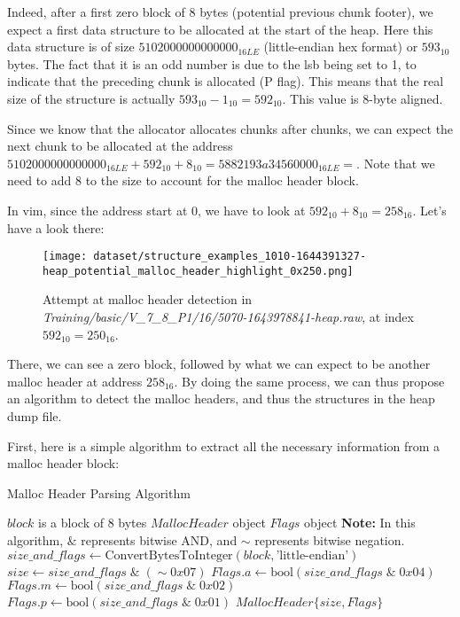     Indeed, after a first zero block of 8 bytes (potential previous chunk footer), we expect a first data structure to be allocated at the start of the heap. Here this data structure is of size $ 5102000000000000_{16LE} $ (little-endian hex format) or $ 593_{10} $ bytes. The fact that it is an odd number is due to the \acrshort{lsb} being set to 1, to indicate that the preceding chunk is allocated (P flag). This means that the real size of the structure is actually $ 593_{10} - 1_{10} = 592_{10} $. This value is 8-byte aligned.

    Since we know that the allocator allocates chunks after chunks, we can expect the next chunk to be allocated at the address $ 5102000000000000_{16LE} + 592_{10} + 8_{10} = 5882193a34560000_{16LE} =  $. Note that we need to add 8 to the size to account for the malloc header block.
    
    In vim, since the address start at 0, we have to look at $ 592_{10} + 8_{10} = 258_{16} $. Let's have a look there:

    \begin{figure}[H]
        \centering
        \texttt{[image: dataset/structure\_examples\_1010-1644391327-heap\_potential\_malloc\_header\_highlight\_0x250.png]}
        \caption{Attempt at malloc header detection in \textit{Training/basic/V\_7\_8\_P1/16/5070-1643978841-heap.raw}, at index $ 592_{10} = 250_{16} $.}
    \end{figure}

    There, we can see a zero block, followed by what we can expect to be another malloc header at address $ 258_{16} $. By doing the same process, we can thus propose an algorithm to detect the malloc headers, and thus the structures in the heap dump file.

    First, here is a simple algorithm to extract all the necessary information from a malloc header block:

    \begin{algorithm}[H]\label{alg:malloc_header_parsing}
        \caption{Malloc Header Parsing Algorithm}
        \begin{algorithmic}[1]
            \Require $block$ is a block of 8 bytes
            \Ensure $MallocHeader$ object
            \Ensure $Flags$ object
            \State \textbf{Note:} In this algorithm, $\&$ represents bitwise AND, and $\sim$ represents bitwise negation.
            \State $size\_and\_flags \leftarrow \text{ConvertBytesToInteger}(block, \text{'little-endian'})$
            \State $size \leftarrow size\_and\_flags \; \& \; (\sim 0x07)$ 
            \State $Flags.a \leftarrow \text{bool}(size\_and\_flags \; \& \; 0x04)$
            \State $Flags.m \leftarrow \text{bool}(size\_and\_flags \; \& \; 0x02)$
            \State $Flags.p \leftarrow \text{bool}(size\_and\_flags \; \& \; 0x01)$
            \State \Return $MallocHeader\{size, Flags\}$
        \EndProcedure
        \end{algorithmic}
    \end{algorithm}

